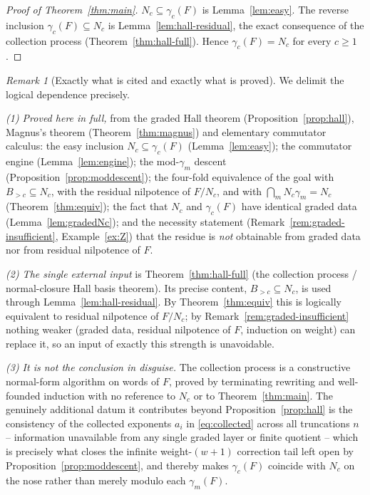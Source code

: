 \documentclass{amsart}
\theoremstyle{definition}
\theoremstyle{remark}
\newtheorem{remark}{Remark}
\begin{document}
\begin{proof}[Proof of Theorem~\ref{thm:main}]
$N_c\subseteq\gamma_c(F)$ is Lemma~\ref{lem:easy}. The reverse inclusion
$\gamma_c(F)\subseteq N_c$ is Lemma~\ref{lem:hall-residual}, the exact consequence
of the collection process (Theorem~\ref{thm:hall-full}). Hence
$\gamma_c(F)=N_c$ for every $c\ge1$.
\end{proof}

\begin{remark}[Exactly what is cited and exactly what is proved]
\label{rem:noncircular}
We delimit the logical dependence precisely.

\emph{(1) Proved here in full,} from the graded Hall theorem
(Proposition~\ref{prop:hall}), Magnus's theorem (Theorem~\ref{thm:magnus}) and
elementary commutator calculus: the easy inclusion $N_c\subseteq\gamma_c(F)$
(Lemma~\ref{lem:easy}); the commutator engine (Lemma~\ref{lem:engine}); the
mod-$\gamma_m$ descent (Proposition~\ref{prop:moddescent}); the four-fold
equivalence of the goal with $B_{>c}\subseteq N_c$, with the residual nilpotence
of $F/N_c$, and with $\bigcap_m N_c\gamma_m=N_c$ (Theorem~\ref{thm:equiv}); the
fact that $N_c$ and $\gamma_c(F)$ have identical graded data
(Lemma~\ref{lem:gradedNc}); and the necessity statement
(Remark~\ref{rem:graded-insufficient}, Example~\ref{ex:Z}) that the residue is
\emph{not} obtainable from graded data nor from residual nilpotence of $F$.

\emph{(2) The single external input} is Theorem~\ref{thm:hall-full} (the
collection process / normal-closure Hall basis theorem). Its precise content,
$B_{>c}\subseteq N_c$, is used through Lemma~\ref{lem:hall-residual}. By
Theorem~\ref{thm:equiv} this is logically equivalent to residual nilpotence of
$F/N_c$; by Remark~\ref{rem:graded-insufficient} nothing weaker (graded data,
residual nilpotence of $F$, induction on weight) can replace it, so an input of
exactly this strength is unavoidable.

\emph{(3) It is not the conclusion in disguise.} The collection process is a
constructive normal-form algorithm on words of $F$, proved by terminating
rewriting and well-founded induction with no reference to $N_c$ or to
Theorem~\ref{thm:main}. The genuinely additional datum it contributes beyond
Proposition~\ref{prop:hall} is the consistency of the collected exponents $a_i$ in
\eqref{eq:collected} across all truncations $n$ -- information unavailable from any
single graded layer or finite quotient -- which is precisely what closes the
infinite weight-$(w{+}1)$ correction tail left open by
Proposition~\ref{prop:moddescent}, and thereby makes $\gamma_c(F)$ coincide with
$N_c$ on the nose rather than merely modulo each $\gamma_m(F)$.
\end{remark}
\end{document}
